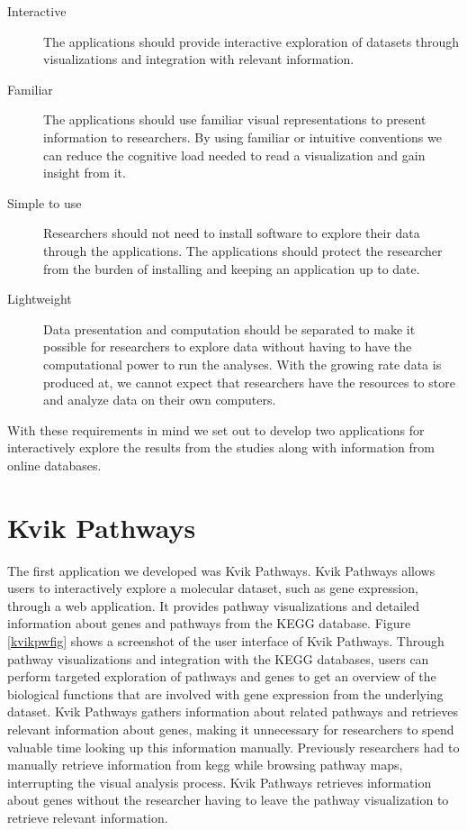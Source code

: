 \begin{description} 
\item[Interactive] The applications should provide interactive exploration
    of datasets through visualizations and integration with relevant
    information.
    
\item[Familiar] The applications should use familiar visual representations to
    present information to researchers. By using familiar or intuitive
        conventions we can reduce the cognitive load needed to read a
        visualization and gain insight from it.\cite{o2018visualization}
    
\item[Simple to use] Researchers should not need to install software to
    explore their data through the applications. The applications should 
    protect the researcher from the burden of installing and keeping an
    application up to date. 
    
\item[Lightweight] Data presentation and computation should be separated
    to make it possible for researchers to explore data without having to
    have the computational power to run the analyses. With the growing rate
    data is produced at, we cannot expect that researchers have the resources to
    store and analyze data on their own computers. 
    
\end{description}

With these requirements in mind we set out to develop two applications for
interactively explore the results from the studies along with information
from online databases. 

\section{Kvik Pathways}
The first application we developed was Kvik Pathways. Kvik Pathways allows users
to interactively explore a molecular dataset, such as gene expression, through a
web application.\cite{fjukstad2015kvik} It provides pathway visualizations and
detailed information about genes and pathways from the KEGG database. Figure
\ref{kvikpwfig} shows a screenshot of the user interface of Kvik Pathways.
Through pathway visualizations and integration with the KEGG databases, users
can perform targeted exploration of pathways and genes to get an overview of the
biological functions that are involved with gene expression from the underlying
dataset.  Kvik Pathways gathers information about related pathways and retrieves
relevant information about genes, making it unnecessary for researchers to spend
valuable time looking up this information manually. Previously researchers had
to manually retrieve information from \gls{kegg} while browsing pathway maps,
interrupting the visual analysis process.  Kvik Pathways retrieves information
about genes without the researcher having to leave the pathway visualization to
retrieve relevant information.

